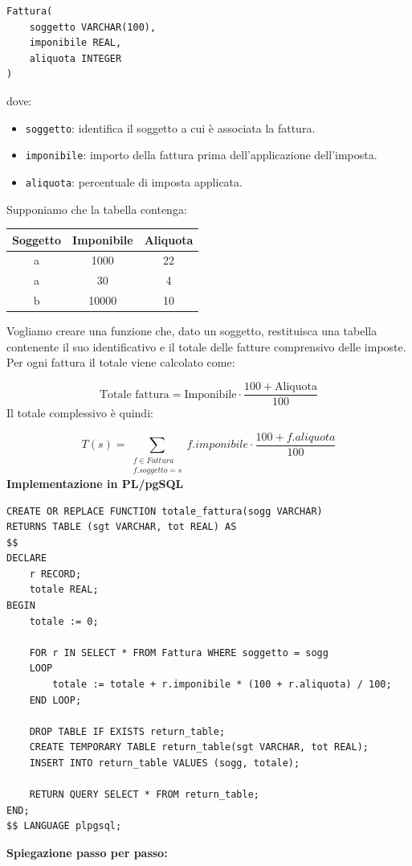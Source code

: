 \begin{verbatim}
Fattura(
    soggetto VARCHAR(100),
    imponibile REAL,
    aliquota INTEGER
)
\end{verbatim}
\noindent 
dove:
\begin{itemize}
    \item \texttt{soggetto}: identifica il soggetto
    a cui è associata la fattura.
    \item \texttt{imponibile}: importo della fattura
    prima dell'applicazione dell'imposta.
    \item \texttt{aliquota}: percentuale di imposta
    applicata.
\end{itemize}
\noindent
Supponiamo che la tabella contenga:

\begin{center}
\begin{tabular}{|c|c|c|}
\hline
Soggetto & Imponibile & Aliquota \\
\hline
a & 1000 & 22 \\
a & 30 & 4 \\
b & 10000 & 10 \\
\hline
\end{tabular}
\end{center}
\noindent
Vogliamo creare una funzione che, dato un soggetto,
restituisca una tabella contenente il suo identificativo
e il totale delle fatture comprensivo delle imposte.\\
Per ogni fattura il totale viene calcolato come:

\[
\text{Totale fattura} =
\text{Imponibile}\cdot
\frac{100+\text{Aliquota}}{100}
\]
Il totale complessivo è quindi:

\[
T(s)=
\sum_{\substack{f\in Fattura\\f.soggetto=s}}
f.imponibile\cdot
\frac{100+f.aliquota}{100}
\]
\textbf{Implementazione in PL/pgSQL}

\begin{verbatim}
CREATE OR REPLACE FUNCTION totale_fattura(sogg VARCHAR)
RETURNS TABLE (sgt VARCHAR, tot REAL) AS
$$
DECLARE
    r RECORD;
    totale REAL;
BEGIN
    totale := 0;

    FOR r IN SELECT * FROM Fattura WHERE soggetto = sogg
    LOOP
        totale := totale + r.imponibile * (100 + r.aliquota) / 100;
    END LOOP;

    DROP TABLE IF EXISTS return_table;
    CREATE TEMPORARY TABLE return_table(sgt VARCHAR, tot REAL);
    INSERT INTO return_table VALUES (sogg, totale);

    RETURN QUERY SELECT * FROM return_table;
END;
$$ LANGUAGE plpgsql;
\end{verbatim}
\textbf{Spiegazione passo per passo:}

